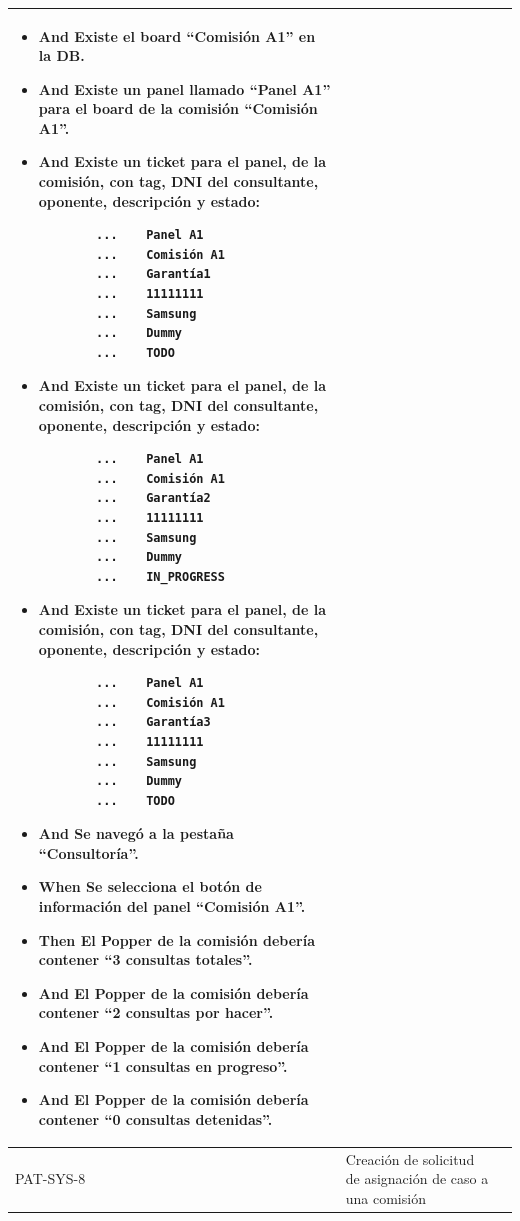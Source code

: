 \begin{longtable}{|p{1cm}|p{2.5cm}|p{12cm}|}
\begin{itemize}
        \item \textbf{And} Existe el board ``Comisión A1'' en la DB.
        \item \textbf{And} Existe un panel llamado ``Panel A1'' para el board de la comisión ``Comisión A1''.
        \item \textbf{And} Existe un ticket para el panel, de la comisión, con tag, DNI del consultante, oponente, descripción y estado:
        \begin{verbatim}
        ...    Panel A1
        ...    Comisión A1
        ...    Garantía1
        ...    11111111
        ...    Samsung
        ...    Dummy
        ...    TODO
            \end{verbatim}
        \item \textbf{And} Existe un ticket para el panel, de la comisión, con tag, DNI del consultante, oponente, descripción y estado:
        \begin{verbatim}
        ...    Panel A1
        ...    Comisión A1
        ...    Garantía2
        ...    11111111
        ...    Samsung
        ...    Dummy
        ...    IN_PROGRESS
            \end{verbatim}
        \item \textbf{And} Existe un ticket para el panel, de la comisión, con tag, DNI del consultante, oponente, descripción y estado:
        \begin{verbatim}
        ...    Panel A1
        ...    Comisión A1
        ...    Garantía3
        ...    11111111
        ...    Samsung
        ...    Dummy
        ...    TODO
            \end{verbatim}
        \item \textbf{And} Se navegó a la pestaña ``Consultoría''.
        \item \textbf{When} Se selecciona el botón de información del panel ``Comisión A1''.
        \item \textbf{Then} El Popper de la comisión debería contener ``3 consultas totales''.
        \item \textbf{And} El Popper de la comisión debería contener ``2 consultas por hacer''.
        \item \textbf{And} El Popper de la comisión debería contener ``1 consultas en progreso''.
        \item \textbf{And} El Popper de la comisión debería contener ``0 consultas detenidas''.
    \end{itemize}
    \\
    \hline
    PAT-SYS-8 & Creación de solicitud de asignación de caso a una comisión &

\end{longtable}
